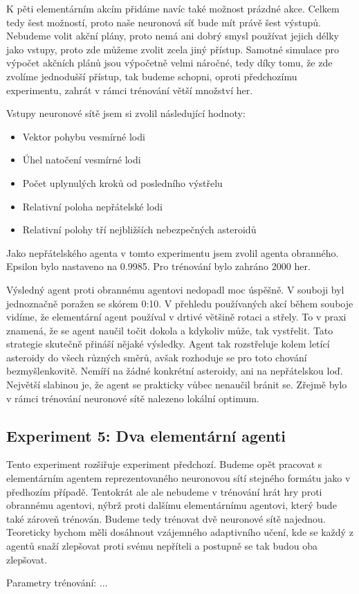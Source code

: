 \par
K pěti elementárním akcím přidáme navíc také možnost prázdné akce. Celkem tedy šest možností, proto naše neuronová síť bude mít právě šest výstupů.
Nebudeme volit akční plány, proto nemá ani dobrý smysl používat jejich délky jako vstupy, proto zde můžeme zvolit zcela jiný přístup.
Samotné simulace pro výpočet akčních plánů jsou výpočetně velmi náročné, tedy díky tomu, že zde zvolíme jednodušší přístup, tak budeme schopni, oproti předchozímu experimentu, zahrát v rámci trénování větší množství her.

\par
Vstupy neuronové sítě jsem si zvolil následující hodnoty:
\begin{itemize}
    \item Vektor pohybu vesmírné lodi
    \item Úhel natočení vesmírné lodi
    \item Počet uplynulých kroků od posledního výstřelu
    \item Relativní poloha nepřátelské lodi
    \item Relativní polohy tří nejbližších nebezpečných asteroidů
\end{itemize}

Jako nepřátelského agenta v tomto experimentu jsem zvolil agenta obranného.
Epsilon bylo nastaveno na 0.9985. Pro trénování bylo zahráno 2000 her.




Výsledný agent proti obrannému agentovi nedopadl moc úspěšně. V souboji byl jednoznačně poražen se skórem 0:10.
V přehledu používaných akcí během souboje vidíme, že elementární agent používal v drtivé většině rotaci a střely.
To v praxi znamená, že se agent naučil točit dokola a kdykoliv může, tak vystřelit. Tato strategie skutečně přináší nějaké výsledky.
Agent tak rozstřeluje kolem letící asteroidy do všech různých směrů, avšak rozhoduje se pro toto chování bezmyšlenkovitě. Nemíří na žádné konkrétní asteroidy, ani na nepřátelskou loď.
Největší slabinou je, že agent se prakticky vůbec nenaučil bránit se. Zřejmě bylo v rámci trénování neuronové sítě nalezeno lokální optimum.



\subsection{Experiment 5: Dva elementární agenti}
Tento experiment rozšiřuje experiment předchozí. Budeme opět pracovat s elementárním agentem reprezentovaného neuronovou sítí stejného formátu jako v předhozím případě.
Tentokrát ale ale nebudeme v trénování hrát hry proti obrannému agentovi, nýbrž proti dalšímu elementárnímu agentovi, který bude také zároveň trénován.
Budeme tedy trénovat dvě neuronové sítě najednou. Teoreticky bychom měli dosáhnout vzájemného adaptivního učení, kde se každý z agentů snaží zlepšovat proti svému nepříteli a postupně se tak budou oba zlepšovat.
\par
Parametry trénování: ... 




